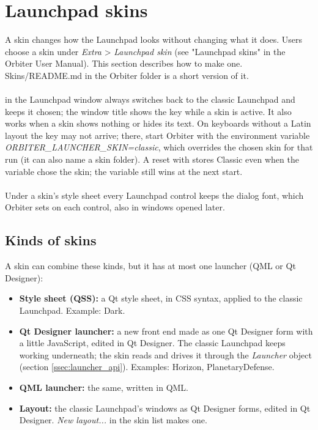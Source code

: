 \documentclass[Orbiter Developer Manual.tex]{subfiles}
\begin{document}
\section{Launchpad skins}
\label{sec:launchpad_skins}
\begin{sloppypar}
A skin changes how the Launchpad looks without changing what it does. Users choose a skin under \textit{Extra} > \textit{Launchpad skin} (see "Launchpad skins" in the Orbiter User Manual). This section describes how to make one. Skins/README.md in the Orbiter folder is a short version of it.\\
\\
\Ctrl\Shift{} in the Launchpad window always switches back to the classic Launchpad and keeps it chosen; the window title shows the key while a skin is active. It also works when a skin shows nothing or hides its text. On keyboards without a Latin layout the key may not arrive; there, start Orbiter with the environment variable \textit{ORBITER\_LAUNCHER\_SKIN=classic}, which overrides the chosen skin for that run (it can also name a skin folder). A reset with \Ctrl\Shift{} stores Classic even when the variable chose the skin; the variable still wins at the next start.\\
\\
Under a skin's style sheet every Launchpad control keeps the dialog font, which Orbiter sets on each control, also in windows opened later.


\subsection{Kinds of skins}
A skin can combine these kinds, but it has at most one launcher (QML or Qt Designer):

\begin{itemize}
\item \textbf{Style sheet (QSS):} a Qt style sheet, in CSS syntax, applied to the classic Launchpad. Example: Dark.
\item \textbf{Qt Designer launcher:} a new front end made as one Qt Designer form with a little JavaScript, edited in Qt Designer. The classic Launchpad keeps working underneath; the skin reads and drives it through the \textit{Launcher} object (section \ref{ssec:launcher_api}). Examples: Horizon, PlanetaryDefense.
\item \textbf{QML launcher:} the same, written in QML.
\item \textbf{Layout:} the classic Launchpad's windows as Qt Designer forms, edited in Qt Designer. \textit{New layout...} in the skin list makes one.
\end{itemize}


\end{sloppypar}
\end{document}
